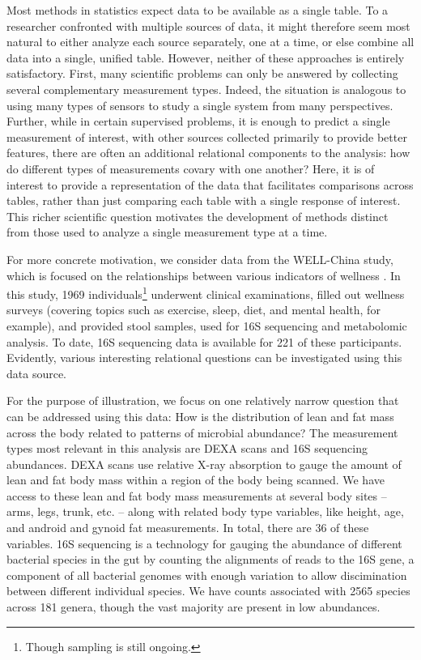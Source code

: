 \documentclass[utf8]{frontiersFPHY} %
\begin{document}
Most methods in statistics expect data to be available as a single table. To a
researcher confronted with multiple sources of data, it might therefore seem
most natural to either analyze each source separately, one at a time, or else
combine all data into a single, unified table. However, neither of these
approaches is entirely satisfactory. First, many scientific problems can only be
answered by collecting several complementary measurement types. Indeed, the
situation is analogous to using many types of sensors to study a single system
from many perspectives. Further, while in certain supervised problems, it is
enough to predict a single measurement of interest, with other sources collected
primarily to provide better features, there are often an additional relational
components to the analysis: how do different types of measurements covary with
one another? Here, it is of interest to provide a representation of the data
that facilitates comparisons across tables, rather than just comparing each
table with a single response of interest. This richer scientific question
motivates the development of methods distinct from those used to analyze a
single measurement type at a time.

For more concrete motivation, we consider data from the WELL-China study, which
is focused on the relationships between various indicators of wellness
\citep{wellchina}. In this study, 1969 individuals\footnote{Though sampling is
  still ongoing.} underwent clinical examinations, filled out wellness surveys
(covering topics such as exercise, sleep, diet, and mental health, for example),
and provided stool samples, used for 16S sequencing and metabolomic analysis. To
date, 16S sequencing data is available for 221 of these participants. Evidently,
various interesting relational questions can be investigated using this data
source.

For the purpose of illustration, we focus on one relatively narrow question that
can be addressed using this data: How is the distribution of lean and fat mass
across the body related to patterns of microbial abundance? The measurement
types most relevant in this analysis are DEXA scans and 16S sequencing abundances.
DEXA scans use relative X-ray absorption to gauge the amount of lean and fat body
mass within a region of the body being scanned. We have access to these
lean and fat body mass measurements at several body sites -- arms, legs, trunk,
etc. -- along with related body type variables, like height, age, and android
and gynoid fat measurements. In total, there are 36 of these variables. 16S
sequencing is a technology for gauging the abundance of different bacterial
species in the gut by counting the alignments of reads to the 16S gene, a
component of all bacterial genomes with enough variation to allow discimination
between different individual species. We have counts associated with 2565
species across 181 genera, though the vast majority are present in low
abundances.
\end{document}
